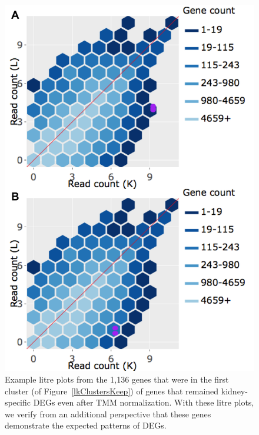 \documentclass{article}
\begin{document}
\null
\begin{figure}[t!]
\centerline{\includegraphics[width=0.7\columnwidth]{../MakeFigures/Dashboards/litreClusterKeep/litreClusterKeep.jpg}}
\caption{Example litre plots from the 1,136 genes that were in the first cluster (of Figure~\ref{lkClustersKeep}) of genes that remained kidney-specific DEGs even after TMM normalization. With these litre plots, we verify from an additional perspective that these genes demonstrate the expected patterns of DEGs.
\label{litreClusterKeep}}
\end{figure}
\end{document}
